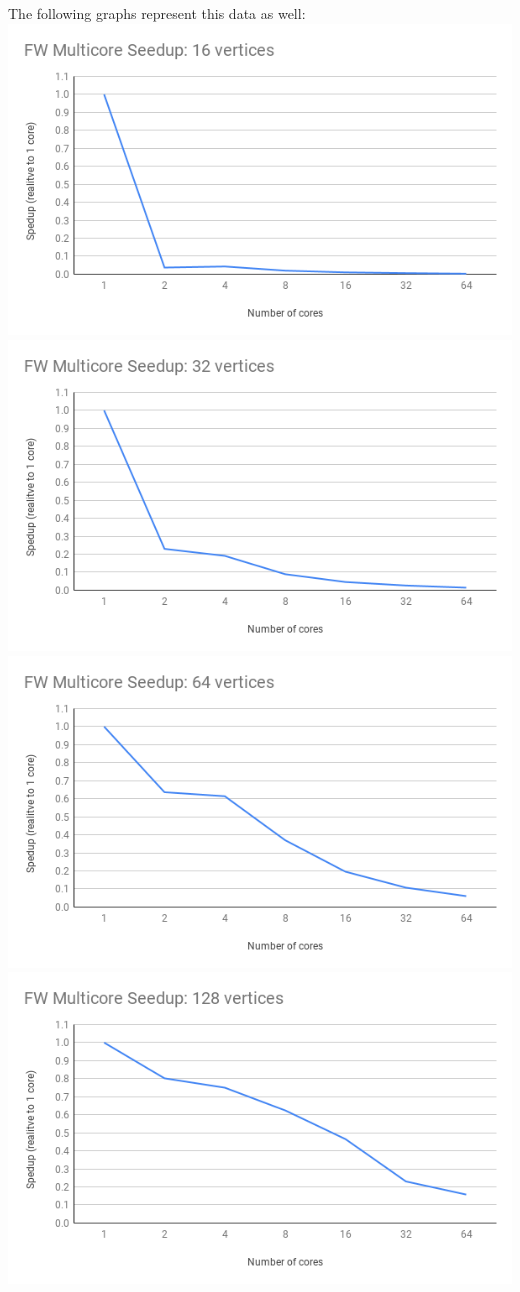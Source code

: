 \documentclass[]{article}
\begin{document}
	The following graphs represent this data as well:
	\\
	\includegraphics[scale=0.5]{graphs/16.png}
	\includegraphics[scale=0.5]{graphs/32.png}
	\includegraphics[scale=0.5]{graphs/64.png}
	\includegraphics[scale=0.5]{graphs/128.png}
\end{document}
